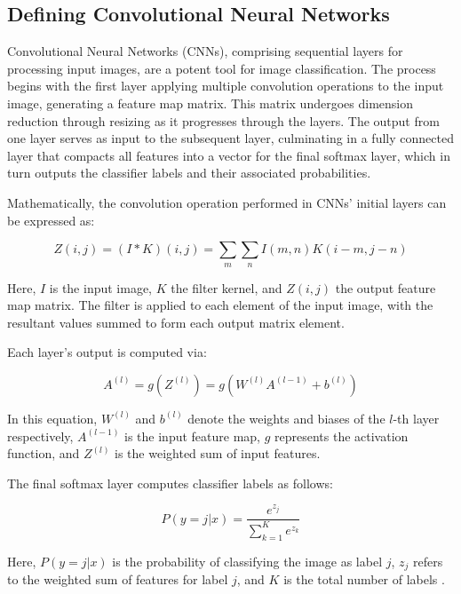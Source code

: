 \documentclass[conference]{IEEEtran}
\begin{document}
\subsection{Defining Convolutional Neural Networks}

Convolutional Neural Networks (CNNs), comprising sequential layers for processing input images, are a potent tool for image classification. The process begins with the first layer applying multiple convolution operations to the input image, generating a feature map matrix. This matrix undergoes dimension reduction through resizing as it progresses through the layers. The output from one layer serves as input to the subsequent layer, culminating in a fully connected layer that compacts all features into a vector for the final softmax layer, which in turn outputs the classifier labels and their associated probabilities.

Mathematically, the convolution operation performed in CNNs' initial layers can be expressed as:

\begin{equation}
Z(i,j) = (I * K)(i,j) = \sum_m \sum_n I(m,n) K(i-m,j-n)
\end{equation}

Here, $I$ is the input image, $K$ the filter kernel, and $Z(i,j)$ the output feature map matrix. The filter is applied to each element of the input image, with the resultant values summed to form each output matrix element.

Each layer's output is computed via:

\begin{equation}
A^{(l)} = g(Z^{(l)}) = g(W^{(l)}A^{(l-1)} + b^{(l)})
\end{equation}

In this equation, $W^{(l)}$ and $b^{(l)}$ denote the weights and biases of the $l$-th layer respectively, $A^{(l-1)}$ is the input feature map, $g$ represents the activation function, and $Z^{(l)}$ is the weighted sum of input features.

The final softmax layer computes classifier labels as follows:

\begin{equation}
P(y=j|x) = \frac{e^{z_j}}{\sum_{k=1}^K e^{z_k}}
\end{equation}

Here, $P(y=j|x)$ is the probability of classifying the image as label $j$, $z_j$ refers to the weighted sum of features for label $j$, and $K$ is the total number of labels \cite{Smeda}.
\end{document}
